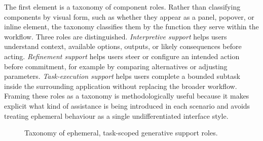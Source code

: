 The first element is a taxonomy of component roles. Rather than classifying components by visual form, such as whether they appear as a panel, popover, or inline element, the taxonomy classifies them by the function they serve within the workflow. Three roles are distinguished. \emph{Interpretive support} helps users understand context, available options, outputs, or likely consequences before acting. \emph{Refinement support} helps users steer or configure an intended action before commitment, for example by comparing alternatives or adjusting parameters. \emph{Task-execution support} helps users complete a bounded subtask inside the surrounding application without replacing the broader workflow. Framing these roles as a taxonomy is methodologically useful because it makes explicit what kind of assistance is being introduced in each scenario and avoids treating ephemeral behaviour as a single undifferentiated interface style.

\begin{figure}[htbp]
    \centering
    \caption{Taxonomy of ephemeral, task-scoped generative support roles.}
    \label{fig:taxonomy}
\end{figure}

